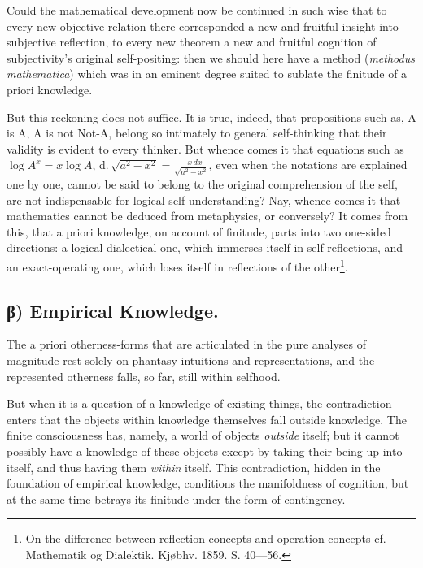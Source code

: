 \documentclass[12pt]{book}
\begin{document}
Could the mathematical development now be continued in such wise
that to every new objective relation there corresponded a new and
fruitful insight into subjective reflection, to every new theorem a
new and fruitful cognition of subjectivity's original self-positing:
then we should here have a method (\textit{methodus mathematica})
which was in an eminent degree suited to sublate the finitude of a
priori knowledge.

But this reckoning does not suffice. It is true, indeed, that
propositions such as, A is A, A is not Not-A, belong so intimately
to general self-thinking that their validity is evident to every
thinker. But whence comes it that equations such as
$\log A^{x} = x \log A$,
d.\,$\sqrt{a^{2}-x^{2}} = \frac{-\,x\,dx}{\sqrt{a^{2}-x^{2}}}$,
even when the notations are explained one by one, cannot be said to
belong to the original comprehension of the self, are not
indispensable for logical self-understanding? Nay, whence comes it
that mathematics cannot be deduced from metaphysics, or conversely?
It comes from this, that a priori knowledge, on account of
finitude, parts into two one-sided directions: a logical-dialectical
one, which immerses itself in self-reflections, and an
exact-operating one, which loses itself in reflections of the
other\footnote{On the difference between reflection-concepts and
operation-concepts cf. Mathematik og Dialektik. Kjøbhv. 1859.
S. 40---56.}.

\subsection*{β) Empirical Knowledge.}

The a priori otherness-forms that are articulated in the pure
analyses of magnitude rest solely on phantasy-intuitions and
representations, and the represented otherness falls, so far, still
within selfhood.

But when it is a question of a knowledge of existing things,
the contradiction enters that the objects within knowledge
themselves fall outside knowledge. The finite consciousness has,
namely, a world of objects \emph{outside} itself; but it cannot
possibly have a knowledge of these objects except by taking their
being up into itself, and thus having them \emph{within} itself.
This contradiction, hidden in the foundation of empirical knowledge,
conditions the manifoldness of cognition, but at the same time
betrays its finitude under the form of contingency.
\end{document}
